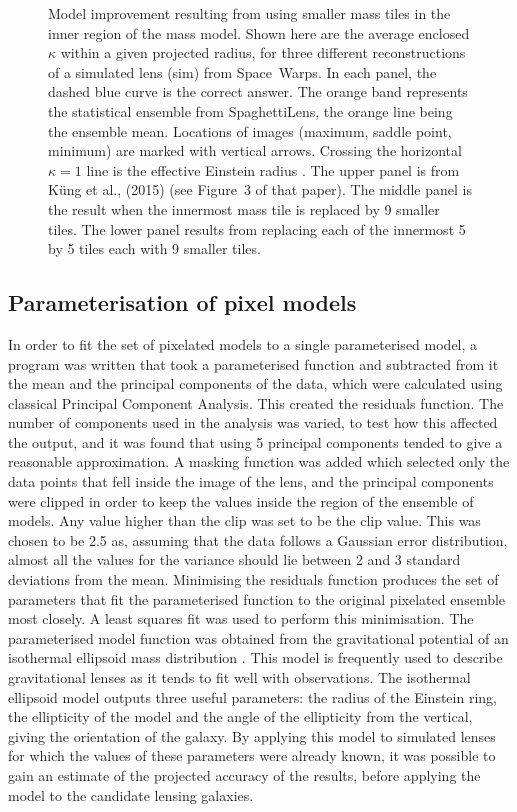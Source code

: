 \begin{figure}
  \caption{Model improvement resulting from using smaller mass tiles
    in the inner region of the mass model.  Shown here are the average
    enclosed $\kappa$ within a given projected radius, for three
    different reconstructions of a simulated lens (sim) from
    Space~Warps.  In each panel, the dashed blue curve is the correct
    answer.  The orange band represents the statistical ensemble from
    SpaghettiLens, the orange line being the ensemble mean.  Locations of
    images (maximum, saddle point, minimum) are marked with vertical
    arrows.  Crossing the horizontal $\kappa=1$ line is the effective
    Einstein radius \ER. The upper panel is from
    K\"ung et al., (2015) (see Figure~3 of that paper).  The middle
    panel is the result when the innermost mass tile is replaced by 9
    smaller tiles.  The lower panel results from replacing each of the
    innermost 5 by 5 tiles each with 9 smaller tiles.}
  \label{fig:subsampling}
\end{figure}

\subsection{Parameterisation of pixel models} \label{subsec:parameter}

In order to fit the set of pixelated models to a single parameterised model, a program was written that took a parameterised function and subtracted from it the mean and the principal components of the data, which were calculated using classical Principal Component Analysis.
This created the residuals function.
The number of components used in the analysis was varied, to test how this affected the output, and it was found that using 5 principal components tended to give a reasonable approximation.
A masking function was added which selected only the data points that fell inside the image of the lens, and the principal components were clipped in order to keep the values inside the region of the ensemble of models.
Any value higher than the clip was set to be the clip value.
This was chosen to be 2.5 as, assuming that the data follows a Gaussian error distribution, almost all the values for the variance should lie between 2 and 3 standard deviations from the mean.
Minimising the residuals function produces the set of parameters that fit the parameterised function to the original pixelated ensemble most closely.
A least squares fit was used to perform this minimisation.
The parameterised model function was obtained from the gravitational potential of an isothermal ellipsoid mass distribution \citep{2001astro.ph..2341K}.
This model is frequently used to describe gravitational lenses as it tends to fit well with observations.
The isothermal ellipsoid model outputs three useful parameters: the radius of the Einstein ring, the ellipticity of the model and the angle of the ellipticity from the vertical, giving the orientation of the galaxy.
By applying this model to simulated lenses for which the values of these parameters were already known, it was possible to gain an estimate of the projected accuracy of the results, before applying the model to the candidate lensing galaxies.

